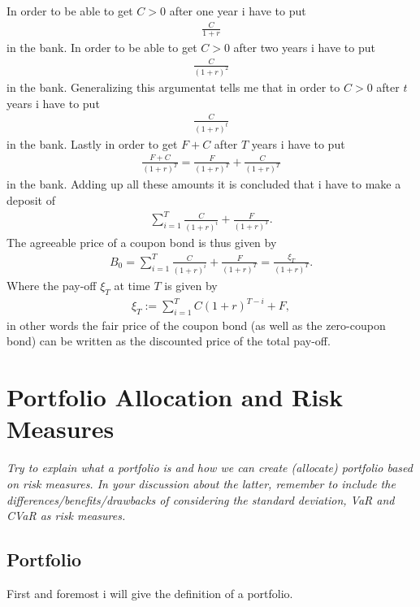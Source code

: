 \documentclass{article}
\theoremstyle{definition}
\numberwithin{equation}{section}
\begin{document}
In order to be able to get $C > 0$ after one year i have to put
\begin{align}
    \frac{C}{1+r}
\end{align}
in the bank.
In order to be able to get $C > 0$ after two years i have to put 
\begin{align}
    \frac{C}{(1+r)^2}
\end{align}
in the bank.
Generalizing this argumentat tells me that in order to $C > 0$ after $t$ years i have to put
\begin{align}
    \frac{C}{(1+r)^t}
\end{align}
in the bank.
Lastly in order to get $F + C$ after $T$ years i have to put
\begin{align}
    \frac{F + C}{(1+r)^T} = \frac{F}{(1+r)^T} + \frac{C}{(1+r)^T}
\end{align}
in the bank.
Adding up all these amounts it is concluded that i have to make a deposit of
\begin{align}
    \sum_{i = 1}^T \frac{C}{(1 + r)^i} + \frac{F}{(1+r)^T}.
\end{align}
The agreeable price of a coupon bond is thus given by
\begin{align}
    B_0 = 
    \sum_{i = 1}^T \frac{C}{(1 + r)^i} + \frac{F}{(1+r)^T} =
    \frac{\xi_T}{(1 + r)^T}.
\end{align}
Where the pay-off $\xi_T$ at time $T$ is given by
\begin{align}
    \xi_T := \sum_{i = 1}^T C(1 + r)^{T -i} + F,
\end{align}
in other words the fair price of the coupon bond (as well as the zero-coupon bond) can be written as the discounted price of the total pay-off.
\newpage

\section{Portfolio Allocation and Risk Measures}
\textit{Try to explain what a portfolio is and how we can create (allocate) portfolio based on risk measures. In your discussion about the latter, remember to include the differences/benefits/drawbacks of considering the standard deviation, VaR and CVaR as risk measures.}

\subsection{Portfolio}
First and foremost i will give the definition of a portfolio.
\end{document}
